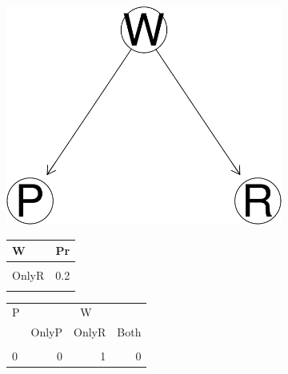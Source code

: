 \documentclass[
  10pt,
]{scrartcl}
\begin{document}
\begin{figure}[H]
\begin{subfigure}[!ht]{0.4\textwidth}

\begin{center}\includegraphics{coherencePaper40_files/figure-latex/robbersDAGplot-1} \end{center}
\end{subfigure} \hfill
\begin{subfigure}[!ht]{0.4\textwidth}

\centering\begingroup\fontsize{9}{11}\selectfont
\begin{tabular}{lr}
\toprule
 W & Pr\\
\midrule
\cellcolor{gray!6}{OnlyP} & \cellcolor{gray!6}{0.2}\\
OnlyR & 0.2\\
\cellcolor{gray!6}{Both} & \cellcolor{gray!6}{0.6}\\
\bottomrule
\end{tabular}




\begin{tabular}{lrrr}
\toprule
\multicolumn{1}{c}{P} & \multicolumn{3}{c}{W} \\
  & OnlyP & OnlyR & Both\\
\midrule
\cellcolor{gray!6}{1} & \cellcolor{gray!6}{1} & \cellcolor{gray!6}{0} & \cellcolor{gray!6}{1}\\
0 & 0 & 1 & 0\\
\bottomrule
\end{tabular}


\end{subfigure}
\end{figure}
\end{document}
